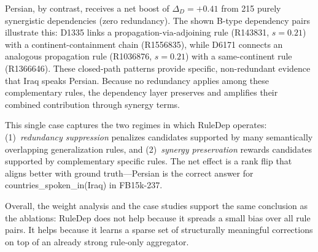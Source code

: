 Persian, by contrast, receives a net boost of $\Delta_D = +0.41$ from 215 purely synergistic dependencies (zero redundancy). The shown B-type dependency pairs illustrate this: D1335 links a propagation-via-adjoining rule (\textsc{R143831}, $s\!=\!0.21$) with a continent-containment chain (\textsc{R1556835}), while D6171 connects an analogous propagation rule (\textsc{R1036876}, $s\!=\!0.21$) with a same-continent rule (\textsc{R1366646}). These closed-path patterns provide specific, non-redundant evidence that Iraq speaks Persian. Because no redundancy applies among these complementary rules, the dependency layer preserves and amplifies their combined contribution through synergy terms.

This single case captures the two regimes in which RuleDep operates: (1)~\emph{redundancy suppression} penalizes candidates supported by many semantically overlapping generalization rules, and (2)~\emph{synergy preservation} rewards candidates supported by complementary specific rules. The net effect is a rank flip that aligns better with ground truth---Persian is the correct answer for countries\_spoken\_in(Iraq) in FB15k-237.

Overall, the weight analysis and the case studies support the same conclusion as the ablations: RuleDep does not help because it spreads a small bias over all rule pairs. It helps because it learns a sparse set of structurally meaningful corrections on top of an already strong rule-only aggregator.

